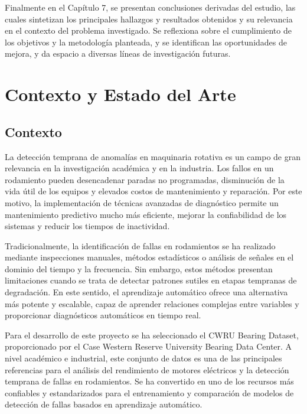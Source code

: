 \documentclass[11pt,a4paper,spanish]{book}
\numberwithin{equation}{chapter}
\numberwithin{figure}{chapter}
\begin{document}
Finalmente en el Capítulo 7, se presentan conclusiones derivadas del estudio, 
las cuales sintetizan los principales hallazgos y resultados obtenidos y su relevancia 
en el contexto del problema investigado. Se reflexiona sobre el cumplimiento de los 
objetivos y la metodología planteada, y se identifican las oportunidades de mejora,
y da espacio a diversas líneas de investigación futuras.


\chapter{Contexto y Estado del Arte}

\section{Contexto}

La detección temprana de anomalías en maquinaria rotativa es un campo de gran 
relevancia en la investigación académica y en la industria. 
Los fallos en un rodamiento pueden desencadenar paradas no programadas, 
disminución de la vida útil de los equipos y elevados costos de mantenimiento y 
reparación. 
Por este motivo, la implementación de técnicas avanzadas de diagnóstico permite un 
mantenimiento predictivo mucho más eficiente, mejorar la confiabilidad de los sistemas 
y reducir los tiempos de inactividad.


Tradicionalmente, la identificación de fallas en rodamientos se ha realizado mediante 
inspecciones manuales, métodos estadísticos o análisis de señales en el dominio del 
tiempo y la frecuencia. 
Sin embargo, estos métodos presentan limitaciones cuando se trata de detectar patrones 
sutiles en etapas tempranas de degradación. 
En este sentido, el aprendizaje automático ofrece una alternativa más potente y 
escalable, capaz de aprender relaciones complejas entre variables y proporcionar 
diagnósticos automáticos en tiempo real.


Para el desarrollo de este proyecto se ha seleccionado el CWRU Bearing Dataset, 
proporcionado por el Case Western Reserve University Bearing Data Center. 
A nivel académico e industrial, este conjunto de datos es una de las principales 
referencias para el análisis del rendimiento de motores eléctricos y la detección 
temprana de fallas en rodamientos. Se ha convertido en uno de los recursos más 
confiables y estandarizados para el entrenamiento y comparación de modelos de detección 
de fallas basados en aprendizaje automático.
\end{document}
